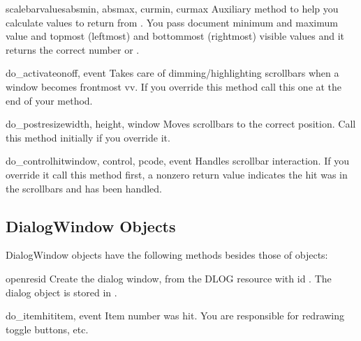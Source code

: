 \begin{funcdesc}{scalebarvalues}{absmin, absmax, curmin, curmax}
Auxiliary method to help you calculate values to return from
. You pass document minimum and maximum value
and topmost (leftmost) and bottommost (rightmost) visible values and
it returns the correct number or .
\end{funcdesc}

\begin{funcdesc}{do_activate}{onoff, event}
Takes care of dimming/highlighting scrollbars when a window becomes
frontmost vv. If you override this method call this one at the end of
your method.
\end{funcdesc}

\begin{funcdesc}{do_postresize}{width, height, window}
Moves scrollbars to the correct position. Call this method initially
if you override it.
\end{funcdesc}

\begin{funcdesc}{do_controlhit}{window, control, pcode, event}
Handles scrollbar interaction. If you override it call this method
first, a nonzero return value indicates the hit was in the scrollbars
and has been handled.
\end{funcdesc}

\subsection{DialogWindow Objects}

DialogWindow objects have the following methods besides those of
 objects:


\begin{funcdesc}{open}{resid}
Create the dialog window, from the DLOG resource with id
. The dialog object is stored in .
\end{funcdesc}

\begin{funcdesc}{do_itemhit}{item, event}
Item number  was hit. You are responsible for redrawing
toggle buttons, etc.
\end{funcdesc}
